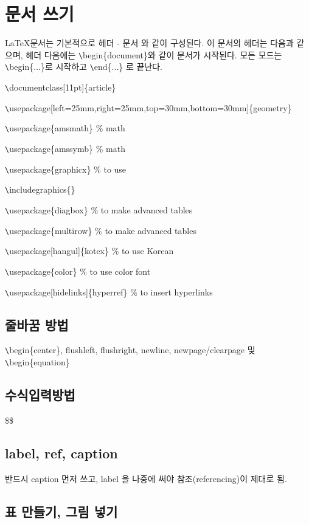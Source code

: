 \documentclass[11pt]{article}
\begin{document}
\section{문서 쓰기}
\LaTeX 문서는 기본적으로 헤더 - 문서 와 같이 구성된다. 이 문서의 헤더는 다음과 같으며, 헤더 다음에는 \verb+\+begin\{document\}와 같이 문서가 시작된다. 모든 모드는 \verb+\+begin\{...\}로 시작하고  \verb+\+end\{...\} 로 끝난다.

\begin{center}
	\verb+\+documentclass[11pt]\{article\}
	
	\verb+\+usepackage[left=25mm,right=25mm,top=30mm,bottom=30mm]\{geometry\}
	
	\verb+\+usepackage\{amsmath\} \% math
	
	\verb+\+usepackage\{amssymb\} \% math
	
	\verb+\+usepackage\{graphicx\} \% to use
	
	\verb+\+includegraphics\{\}
	
	\verb+\+usepackage\{diagbox\} \% to make advanced tables
	
	\verb+\+usepackage\{multirow\} \% to make advanced tables 
	
	\verb+\+usepackage[hangul]\{kotex\} \% to use Korean
	
	\verb+\+usepackage\{color\} \% to use color font 
	
	\verb+\+usepackage[hidelinks]\{hyperref\} \% to insert hyperlinks
\end{center}

\subsection{줄바꿈 방법}

\verb+\+begin\{center\}, flushleft, flushright, newline, newpage/clearpage 및 \verb+\+begin\{equation\}

\subsection{수식입력방법}
\$\$

\subsection{label, ref, caption}

반드시 caption 먼저 쓰고, label 을 나중에 써야 참조(referencing)이 제대로 됨.

\subsection{표 만들기, 그림 넣기}
\end{document}
